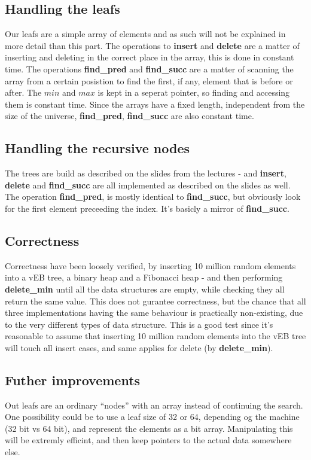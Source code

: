 \subsection*{Handling the leafs}
Our leafs are a simple array of elements and as such will not be explained in more detail than this part. The operations to \textbf{insert} and \textbf{delete} are a matter of inserting and deleting in the correct place in the array, this is done in constant time. The operations \textbf{find\_pred} and \textbf{find\_succ} are a matter of scanning the array from a certain posistion to find the first, if any, element that is before or after. The $min$ and $max$ is kept in a seperat pointer, so finding and accessing them is constant time. Since the arrays have a fixed length, independent from the size of the universe, \textbf{find\_pred}, \textbf{find\_succ} are also constant time.

\subsection*{Handling the recursive nodes}
The trees are build as described on the slides from the lectures - and \textbf{insert}, \textbf{delete} and \textbf{find\_succ} are all implemented as described on the slides as well. The operation \textbf{find\_pred}, is mostly identical to \textbf{find\_succ}, but obviously look for the first element preceeding the index. It's basicly a mirror of \textbf{find\_succ}.

\subsection*{Correctness}
Correctness have been loosely verified, by inserting 10 million random elements into a vEB tree, a binary heap and a Fibonacci heap - and then performing \textbf{delete\_min} until all the data structures are empty, while checking they all return the same value. This does not gurantee correctness, but the chance that all three implementations having the same behaviour is practically non-existing, due to the very different types of data structure. This is a good test since it's reasonable to assume that inserting 10 million random elements into the vEB tree will touch all insert cases, and same applies for delete (by \textbf{delete\_min}).

\subsection*{Futher improvements}
Out leafs are an ordinary ``nodes'' with an array instead of continuing the search. One possibility could be to use a leaf size of 32 or 64, depending og the machine (32 bit vs 64 bit), and represent the elements as a bit array. Manipulating this will be extremly efficint, and then keep pointers to the actual data somewhere else.